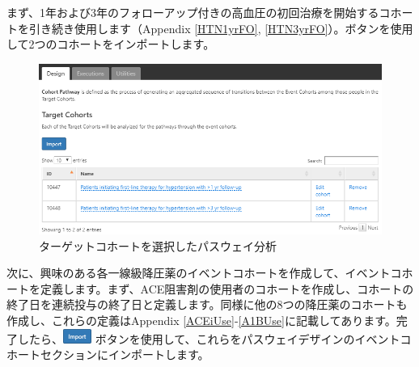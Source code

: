 \documentclass[
  11pt]{book}
\theoremstyle{definition}
\theoremstyle{definition}
\theoremstyle{definition}
\theoremstyle{definition}
\theoremstyle{remark}
\begin{document}
まず、1年および3年のフォローアップ付きの高血圧の初回治療を開始するコホートを引き続き使用します（Appendix \ref{HTN1yrFO}, \ref{HTN3yrFO}）。ボタンを使用して2つのコホートをインポートします。

\begin{figure}

{\centering \includegraphics[width=1\linewidth]{images/Characterization/atlasPathwaysTargetCohorts} 

}

\caption{ターゲットコホートを選択したパスウェイ分析}\label{fig:atlasPathwaysTargetCohorts}
\end{figure}

次に、興味のある各一線級降圧薬のイベントコホートを作成して、イベントコホートを定義します。まず、ACE阻害剤の使用者のコホートを作成し、コホートの終了日を連続投与の終了日と定義します。同様に他の8つの降圧薬のコホートも作成し、これらの定義はAppendix \ref{ACEiUse}-\ref{A1BUse}に記載してあります。完了したら、\includegraphics{images/Characterization/atlasImportButton.png} ボタンを使用して、これらをパスウェイデザインのイベントコホートセクションにインポートします。
\end{document}

